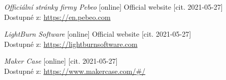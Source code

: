 \begin{thebibliography}{99}
\textit{Officiální stránky firmy Pebeo} [online] Official website [cit. 2021-05-27] \\
Dostupné z: \url{https://en.pebeo.com} 

\textit{LightBurn Software} [online] Official website [cit. 2021-05-27] \\
Dostupné z: \url{https://lightburnsoftware.com} 

\textit{Maker Case} [online] [cit. 2021-05-27] \\
Dostupné z: \url{https://www.makercase.com/#/}




\end{thebibliography}
